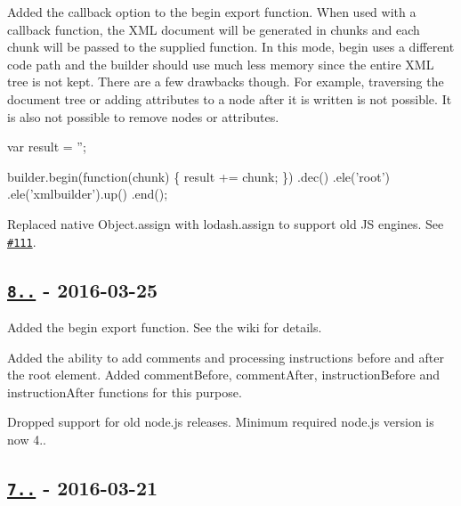 \begin{DoxyItemize}
\item Added the callback option to the {\ttfamily begin} export function. When used with a callback function, the X\+ML document will be generated in chunks and each chunk will be passed to the supplied function. In this mode, {\ttfamily begin} uses a different code path and the builder should use much less memory since the entire X\+ML tree is not kept. There are a few drawbacks though. For example, traversing the document tree or adding attributes to a node after it is written is not possible. It is also not possible to remove nodes or attributes.
\end{DoxyItemize}


\begin{DoxyCode}
var result = '';

builder.begin(function(chunk) \{ result += chunk; \})
  .dec()
  .ele('root')
    .ele('xmlbuilder').up()
  .end();
\end{DoxyCode}



\begin{DoxyItemize}
\item Replaced native {\ttfamily Object.\+assign} with {\ttfamily lodash.\+assign} to support old JS engines. See \href{https://github.com/oozcitak/xmlbuilder-js/issues/111}{\tt \#111}.
\end{DoxyItemize}

\subsection*{\href{https://github.com/oozcitak/xmlbuilder-js/compare/v7.0.0...v8.0.0}{\tt 8..} -\/ 2016-\/03-\/25}


\begin{DoxyItemize}
\item Added the {\ttfamily begin} export function. See the wiki for details.
\item Added the ability to add comments and processing instructions before and after the root element. Added {\ttfamily comment\+Before}, {\ttfamily comment\+After}, {\ttfamily instruction\+Before} and {\ttfamily instruction\+After} functions for this purpose.
\item Dropped support for old node.\+js releases. Minimum required node.\+js version is now 4..
\end{DoxyItemize}

\subsection*{\href{https://github.com/oozcitak/xmlbuilder-js/compare/v6.0.0...v7.0.0}{\tt 7..} -\/ 2016-\/03-\/21}


